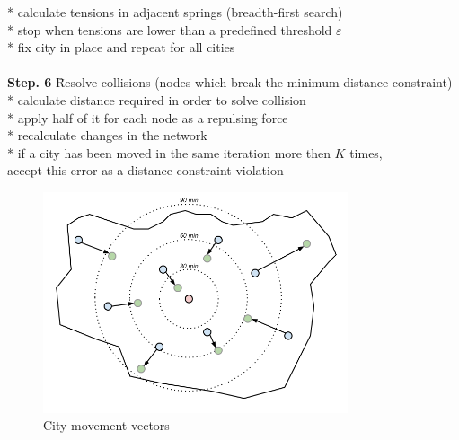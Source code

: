 \documentclass[a4paper,11pt]{article}
\newenvironment{boxedcode}
 {\setlength{\fboxsep}{1em}%
  \begin{lrbox}{\boxedcodebox}
  \begin{minipage}{\dimexpr\textwidth-2\fboxsep-2\fboxrule\relax}
  \begin{tabbing}}
 {\end{tabbing}
  \end{minipage}
  \end{lrbox}%
  \fbox{\usebox{\boxedcodebox}}}
\begin{document}
\begin{center}
\begin{boxedcode}
  \> * calculate tensions in adjacent springs (breadth-first search)\\
  \> * stop when tensions are lower than a predefined threshold
  $\varepsilon$\\
  \> * fix city in place and repeat for all cities\\
  \\
  \textbf{Step. 6} \= Resolve collisions (nodes which break the
  minimum distance constraint)\\
  \> * calculate distance required in order to solve collision\\
  \> * apply half of it for each node as a repulsing force\\
  \> * recalculate changes in the network\\
  \> * if a city has been moved in the same iteration more then $K$
  times,\\\> accept this error as a distance constraint violation\\
  
\end{boxedcode}

\label{alg}
\end{center}


\begin{figure}[h!]
  \centering
  \includegraphics[width=0.8\textwidth]{forces.png}
  \caption{City movement vectors}
  \label{forces}
\end{figure}
\end{document}
